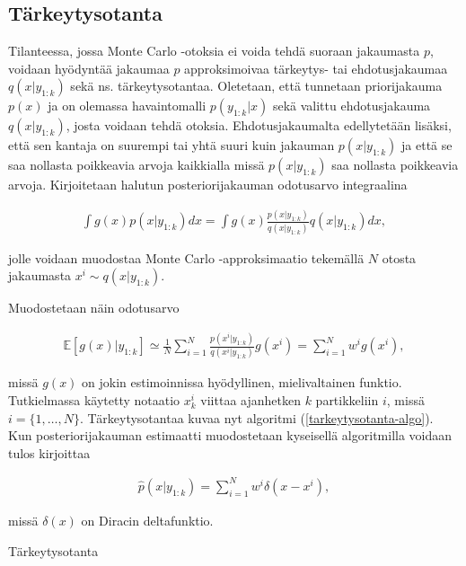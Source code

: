 \documentclass[
  12pt,
  a4paper, twoside]{book}
\begin{document}
\subsection{Tärkeytysotanta}

Tilanteessa, jossa Monte Carlo -otoksia ei voida tehdä suoraan jakaumasta \(p\), voidaan hyödyntää jakaumaa \(p\) approksimoivaa tärkeytys- tai ehdotusjakaumaa \(q(x|y_{1:k})\) sekä ns. tärkeytysotantaa. Oletetaan, että tunnetaan priorijakauma \(p(x)\) ja on olemassa havaintomalli \(p(y_{1:k}|x)\) sekä valittu ehdotusjakauma \(q(x|y_{1:k})\), josta voidaan tehdä otoksia. Ehdotusjakaumalta edellytetään lisäksi, että sen kantaja on suurempi tai yhtä suuri kuin jakauman \(p(x|y_{1:k})\) ja että se saa nollasta poikkeavia arvoja kaikkialla missä \(p(x|y_{1:k})\) saa nollasta poikkeavia arvoja. Kirjoitetaan halutun posteriorijakauman odotusarvo integraalina

\begin{align}
\int g(x)p(x|y_{1:k})dx=\int g(x)\frac{p(x|y_{1:k})}{q(x|y_{1:k})}q(x|y_{1:k})dx,
\end{align}

\noindent jolle voidaan muodostaa Monte Carlo -approksimaatio tekemällä \(N\) otosta jakaumasta \(x^i \sim q(x|y_{1:k})\).

Muodostetaan näin odotusarvo

\begin{align}
\mathbb{E}[g(x)|y_{1:k}]\simeq\frac{1}{N}\sum_{i=1}^N\frac{p(x^i|y_{1:k})}{q(x^i|y_{1:k})}g(x^i)=\sum_{i=1}^Nw^ig(x^i),
\end{align}

\noindent missä \(g(x)\) on jokin estimoinnissa hyödyllinen, mielivaltainen funktio. Tutkielmassa käytetty notaatio \(x_k^i\) viittaa ajanhetken \(k\) partikkeliin \(i\), missä \(i=\{1,\ldots,N\}\). Tärkeytysotantaa kuvaa nyt algoritmi (\ref{tarkeytysotanta-algo}). Kun posteriorijakauman estimaatti muodostetaan kyseisellä algoritmilla voidaan tulos kirjoittaa

\begin{align}
\hat{p}(x|y_{1:k})=\sum_{i=1}^{N}w^i \delta(x-x^i),
\end{align}

\noindent missä \(\delta(x)\) on Diracin deltafunktio.

\begin{algorithm}[H]
\label{tarkeytysotanta-algo}
\DontPrintSemicolon
{}  
\caption{Tärkeytysotanta}
\end{algorithm}
\end{document}
